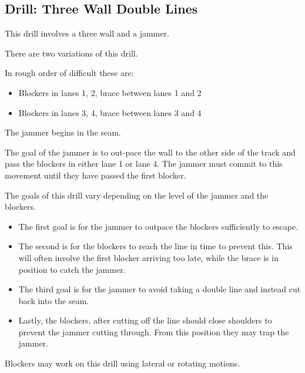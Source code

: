 \subsection{Drill: Three Wall Double Lines}
\label{drill:three_wall/double_lines}

This drill involves a three wall and a jammer.

There are two variations of this drill.

In rough order of difficult these are:
\begin{itemize}
\item Blockers in lanes 1, 2, brace between lanes 1 and 2 
\item Blockers in lanes 3, 4, brace between lanes 3 and 4 
\end{itemize} 

The jammer begins in the seam. 

The goal of the jammer is to out-pace the wall to the other side of the track and pass the blockers in either lane 1 or lane 4.
The jammer must commit to this movement until they have passed the first blocker. 


The goals of this drill vary depending on the level of the jammer and the blockers.

\begin{itemize}
\item The first goal is for the jammer to outpace the blockers sufficiently to escape.
\item The second is for the blockers to reach the line in time to prevent this. This will often involve the first blocker arriving too late, while the brace is in position to catch the jammer.
\item The third goal is for the jammer to avoid taking a double line and instead cut back into the seam.
\item Lastly, the blockers, after cutting off the line should close shoulders to prevent the jammer cutting through. From this position they may trap the jammer.
\end{itemize}

Blockers may work on this drill using lateral or rotating motions.

